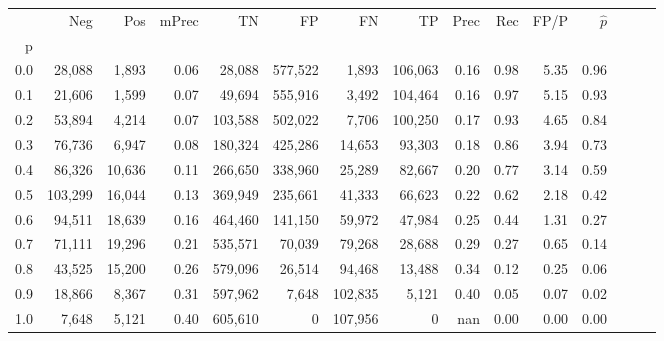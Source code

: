 \begin{tabular}{rrrrrrrrrrrrrrr}
\toprule
{} &      Neg &     Pos & mPrec &       TN &       FP &       FN &       TP &  Prec &   Rec &  FP/P & $\hat{p}$ \\
p   &          &         &       &          &          &          &          &       &       &       &           \\
\midrule
0.0 &   28,088 &   1,893 &  0.06 &   28,088 &  577,522 &    1,893 &  106,063 &  0.16 &  0.98 &  5.35 &      0.96 \\
0.1 &   21,606 &   1,599 &  0.07 &   49,694 &  555,916 &    3,492 &  104,464 &  0.16 &  0.97 &  5.15 &      0.93 \\
0.2 &   53,894 &   4,214 &  0.07 &  103,588 &  502,022 &    7,706 &  100,250 &  0.17 &  0.93 &  4.65 &      0.84 \\
0.3 &   76,736 &   6,947 &  0.08 &  180,324 &  425,286 &   14,653 &   93,303 &  0.18 &  0.86 &  3.94 &      0.73 \\
0.4 &   86,326 &  10,636 &  0.11 &  266,650 &  338,960 &   25,289 &   82,667 &  0.20 &  0.77 &  3.14 &      0.59 \\
0.5 &  103,299 &  16,044 &  0.13 &  369,949 &  235,661 &   41,333 &   66,623 &  0.22 &  0.62 &  2.18 &      0.42 \\
0.6 &   94,511 &  18,639 &  0.16 &  464,460 &  141,150 &   59,972 &   47,984 &  0.25 &  0.44 &  1.31 &      0.27 \\
0.7 &   71,111 &  19,296 &  0.21 &  535,571 &   70,039 &   79,268 &   28,688 &  0.29 &  0.27 &  0.65 &      0.14 \\
0.8 &   43,525 &  15,200 &  0.26 &  579,096 &   26,514 &   94,468 &   13,488 &  0.34 &  0.12 &  0.25 &      0.06 \\
0.9 &   18,866 &   8,367 &  0.31 &  597,962 &    7,648 &  102,835 &    5,121 &  0.40 &  0.05 &  0.07 &      0.02 \\
1.0 &    7,648 &   5,121 &  0.40 &  605,610 &        0 &  107,956 &        0 &   nan &  0.00 &  0.00 &      0.00 \\
\bottomrule
\end{tabular}

